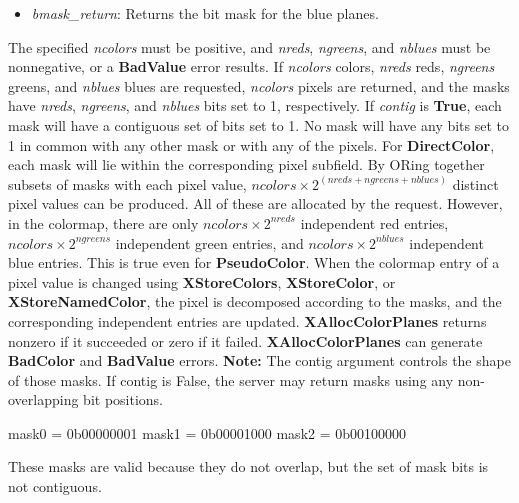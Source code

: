 \documentclass{report}
\begin{document}
\begin{itemize}
\begin{itemize}
                \item \textit{bmask\_return}: Returns the bit mask for the blue planes.
            \end{itemize}
            \noindent
            The specified \textit{ncolors} must be positive, and \textit{nreds}, \textit{ngreens}, and \textit{nblues} must be nonnegative, or a \textbf{BadValue} error results. If \textit{ncolors} colors, \textit{nreds} reds, \textit{ngreens} greens, and \textit{nblues} blues are requested, \textit{ncolors} pixels are returned, and the masks have \textit{nreds}, \textit{ngreens}, and \textit{nblues} bits set to 1, respectively. If \textit{contig} is \textbf{True}, each mask will have a contiguous set of bits set to 1. No mask will have any bits set to 1 in common with any other mask or with any of the pixels.
            \bigbreak \noindent
            For \textbf{DirectColor}, each mask will lie within the corresponding pixel subfield. By ORing together subsets of masks with each pixel value, $\textit{ncolors} \times 2^{(\textit{nreds} + \textit{ngreens} + \textit{nblues})}$ distinct pixel values can be produced. All of these are allocated by the request.
            \bigbreak \noindent
            However, in the colormap, there are only $\textit{ncolors} \times 2^{\textit{nreds}}$ independent red entries, $\textit{ncolors} \times 2^{\textit{ngreens}}$ independent green entries, and $\textit{ncolors} \times 2^{\textit{nblues}}$ independent blue entries. This is true even for \textbf{PseudoColor}. When the colormap entry of a pixel value is changed using \textbf{XStoreColors}, \textbf{XStoreColor}, or \textbf{XStoreNamedColor}, the pixel is decomposed according to the masks, and the corresponding independent entries are updated. \textbf{XAllocColorPlanes} returns nonzero if it succeeded or zero if it failed.
            \bigbreak \noindent
            \textbf{XAllocColorPlanes} can generate \textbf{BadColor} and \textbf{BadValue} errors.
            \bigbreak \noindent
            \textbf{Note:} The contig argument controls the shape of those masks. If contig is False, the server may return masks using any non-overlapping bit positions. 
            \bigbreak \noindent 
            \begin{cppcode}
                mask0 = 0b00000001
                mask1 = 0b00001000
                mask2 = 0b00100000
            \end{cppcode}
            \bigbreak \noindent 
            These masks are valid because they do not overlap, but the set of mask bits is not contiguous.

\end{itemize}
\end{document}
